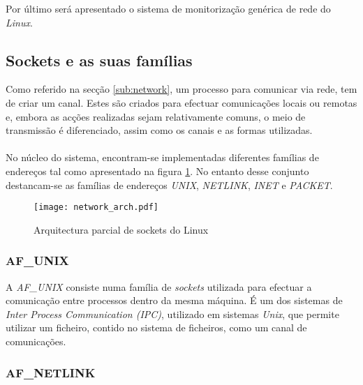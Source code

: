 Por último será apresentado o sistema de monitorização genérica de rede do \textit{Linux}.

 
\subsection{Sockets e as suas famílias}
\label{sub:sockets}

Como referido na secção \ref{sub:network}, um processo para comunicar via rede, tem de criar um canal.
Estes são criados para efectuar comunicações locais ou remotas e, embora as acções realizadas sejam relativamente comuns, o meio de transmissão é diferenciado, assim como os canais e as formas utilizadas.

\paragraph*{}

No núcleo do sistema, encontram-se implementadas diferentes famílias de endereços tal como apresentado na figura \ref{fig:network_arch}.
No entanto desse conjunto destancam-se as famílias de endereços \textit{UNIX}, \textit{NETLINK}, \textit{INET} e \textit{PACKET}.\cite{ULNI,TLNA}

\begin{figure}[!htbp]
\centering
\texttt{[image: network\_arch.pdf]} 
\caption{Arquitectura parcial de sockets do Linux}
\label{fig:network_arch}
\end{figure}

\subsubsection{AF\_UNIX}

A \textit{AF\_UNIX} consiste numa família de \textit{sockets} utilizada para efectuar a comunicação entre processos dentro da mesma máquina.
É um dos sistemas de \textit{Inter Process Communication (IPC)}, utilizado em sistemas \textit{Unix}, que permite utilizar um ficheiro, contido no sistema de ficheiros, como um canal de comunicações.

\subsubsection{AF\_NETLINK}

